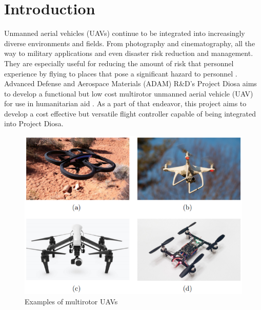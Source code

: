 \documentclass[english]{upeeei}
\begin{document}
\begin{frontmatter}
\setlength{\parskip}{0pt}
\tableofcontents
\listoffigures
\end{frontmatter}
\def\MASTERDOC{true}

\chapter{Introduction}
Unmanned aerial vehicles (UAVs) continue to be integrated into increasingly diverse environments and
fields. From photography and cinematography, all the way to military applications and even disaster risk reduction and 
management. They are especially useful for reducing the amount of risk that personnel experience by flying to places that 
pose a significant hazard to personnel \cite{ICNSC2010}. Advanced Defense and Aerospace Materials (ADAM) R\&D's Project
Diosa aims to develop a functional but low cost multirotor unmanned aerial vehicle (UAV) for use in humanitarian aid
\cite{diosa2020}. As a part of that endeavor, this project aims to develop a cost effective but versatile flight 
controller capable of being integrated into Project Diosa.
\begin{figure}[h]
    \centering
    \includegraphics[scale=0.5]{images/droneExamples.PNG}
    \caption{Examples of multirotor UAVs \cite{zimmerman2016}}
    \label{fig:droneExamples}
\end{figure}
\end{document}
